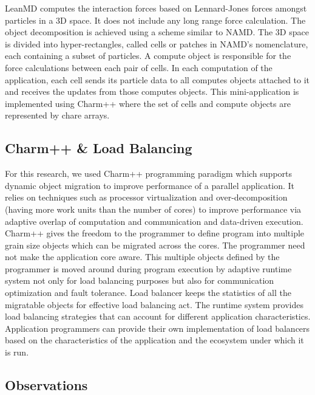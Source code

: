 \begin{itemize}
LeanMD computes the interaction forces based on Lennard-Jones forces amongst
particles in a 3D space. It does not include any long range force calculation.
The object decomposition is achieved using a scheme similar to NAMD. The 3D
space is divided into hyper-rectangles, called cells or patches in NAMD’s
nomenclature, each containing a subset of particles. A compute object is
responsible for the force calculations between each pair of cells. In each
computation of the application, each cell sends its particle data to all
computes objects attached to it and receives the updates from those computes
objects. This mini-application is implemented using Charm++ where the set of
cells and compute objects are represented by chare arrays.
\end{itemize}


\subsection{Charm++ \& Load Balancing}
For this research, we used Charm++ programming paradigm which supports dynamic
object migration to improve performance of a parallel
application\cite{KaleCharm}.  It relies on techniques such as processor
virtualization and over-decomposition (having more work units than the number
    of cores) to improve performance via adaptive overlap of computation and
communication and data-driven execution.  Charm++ gives the freedom to the
programmer to define program into multiple grain size objects which can be
migrated across the cores. The programmer need not make the application core
aware. This multiple objects defined by the programmer is moved around during
program execution by adaptive runtime system not only for load balancing
purposes but also for communication optimization and fault tolerance. Load
balancer keeps the statistics of all the migratable objects for effective load
balancing act\cite{appBalancer99}.  The runtime system provides load balancing
strategies that can account for different application characteristics.
Application programmers can provide their own implementation of load balancers
based on the characteristics of the application and the ecosystem under which
it is run.


\subsection{Observations}

